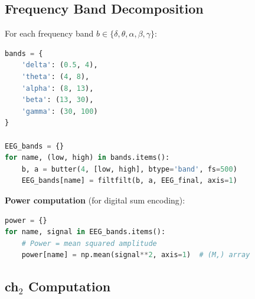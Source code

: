 \subsection{Frequency Band Decomposition}

\begin{algorithm}[H]\caption{Bandpass Filtering}\label{alg:bands}
For each frequency band $b \in \{\delta, \theta, \alpha, \beta, \gamma\}$:

\begin{lstlisting}[language=Python]
bands = {
    'delta': (0.5, 4),
    'theta': (4, 8),
    'alpha': (8, 13),
    'beta': (13, 30),
    'gamma': (30, 100)
}

EEG_bands = {}
for name, (low, high) in bands.items():
    b, a = butter(4, [low, high], btype='band', fs=500)
    EEG_bands[name] = filtfilt(b, a, EEG_final, axis=1)
\end{lstlisting}

\textbf{Power computation} (for digital sum encoding):
\begin{lstlisting}[language=Python]
power = {}
for name, signal in EEG_bands.items():
    # Power = mean squared amplitude
    power[name] = np.mean(signal**2, axis=1)  # (M,) array
\end{lstlisting}
\end{algorithm}

\subsection{ch\texorpdfstring{$_2$}{\_2} Computation}


